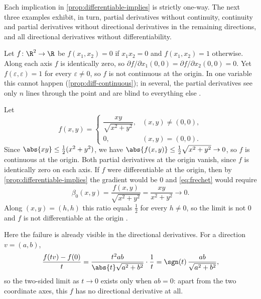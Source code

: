 Each implication in \autoref{prop:differentiable-implies} is strictly one-way.
The next three examples exhibit, in turn, partial derivatives without continuity,
continuity and partial derivatives without directional derivatives in the
remaining directions, and all directional derivatives without differentiability.

\begin{eg}\label{eg:partials-no-continuity}
	Let $f\colon\R^2\to\R$ be $f(x_1,x_2)=0$ if $x_1x_2=0$ and $f(x_1,x_2)=1$
	otherwise. Along each axis $f$ is identically zero, so
	$\partial f/\partial x_1(0,0)=\partial f/\partial x_2(0,0)=0$. Yet
	$f(\varepsilon,\varepsilon)=1$ for every $\varepsilon\neq0$, so $f$ is not
	continuous at the origin. In one variable this cannot happen
	(\autoref{prop:diff-continuous}); in several, the partial derivatives see only
	$n$ lines through the point and are blind to everything else
	\autocite[Rem.~11.4, p.~375]{fukuda2026notes}.
\end{eg}

\begin{eg}\label{eg:no-differentiability}
	Let
	\[
		f(x,y)=
		\begin{cases}
			\dfrac{xy}{\sqrt{x^2+y^2}}, & (x,y)\neq(0,0), \\[1.5ex]
			0,                          & (x,y)=(0,0).
		\end{cases}
	\]
	Since $\abs{xy}\leq\tfrac12(x^2+y^2)$, we have
	$\abs{f(x,y)}\leq\tfrac12\sqrt{x^2+y^2}\to0$, so $f$ is continuous at the
	origin. Both partial derivatives at the origin vanish, since $f$ is identically
	zero on each axis. If $f$ were differentiable at the origin, then by
	\autoref{prop:differentiable-implies} the gradient would be $0$ and
	\eqref{eq:frechet} would require
	\[
		\beta_0(x,y)=\frac{f(x,y)}{\sqrt{x^2+y^2}}=\frac{xy}{x^2+y^2}\to0 .
	\]
	Along $(x,y)=(h,h)$ this ratio equals $\tfrac12$ for every $h\neq0$, so the
	limit is not $0$ and $f$ is not differentiable at the origin
	\autocite[Rem.~11.3, p.~374]{fukuda2026notes}.

	Here the failure is already visible in the directional derivatives. For a
	direction $v=(a,b)$,
	\[
		\frac{f(tv)-f(0)}{t}=\frac{t^2ab}{\abs{t}\sqrt{a^2+b^2}}\cdot\frac1t
		=\sgn(t)\,\frac{ab}{\sqrt{a^2+b^2}},
	\]
	so the two-sided limit as $t\to0$ exists only when $ab=0$: apart from the two
	coordinate axes, this $f$ has no directional derivative at all.
\end{eg}

